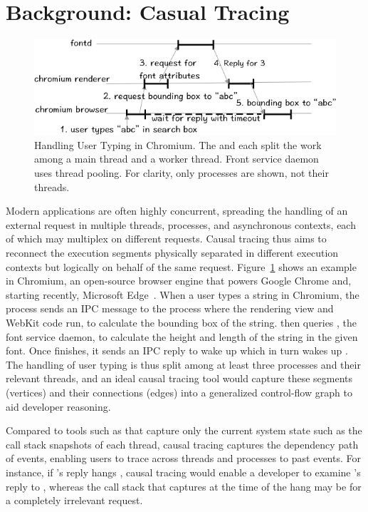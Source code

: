 \section{Background: Casual Tracing} \label{sec:background}

\begin{figure}[tb]
	\footnotesize
    \centering
	 \includegraphics[width=\columnwidth]{./figures/causaltracing_example.png}
    \caption{Handling User Typing in Chromium.  The  and
       each split the work among a main thread and a worker
      thread.  Front service daemon  uses thread pooling.  For
      clarity, only processes are shown, not their threads.}
    \label{fig:chromium-normal}
\end{figure}

Modern applications are often highly concurrent, spreading the handling of
an external request in multiple threads, processes, and asynchronous
contexts, each of which may multiplex on different requests.  Causal
tracing thus aims to reconnect the execution segments physically separated
in different execution contexts but logically on behalf of the same
request.  Figure~\ref{fig:chromium-normal} shows an example in Chromium,
an open-source browser engine that powers Google Chrome and, starting
recently, Microsoft Edge~\cite{chromiumurl}. When a user types a string in
Chromium, the  process sends an IPC message to the 
process where the rendering view and WebKit code run, to calculate the
bounding box of the string.   then queries , the font
service daemon, to calculate the height and length of the string in the
given font.  Once  finishes, it sends an IPC reply to wake up
 which in turn wakes up .  The handling of user
typing is thus split among at least three processes and their relevant
threads, and an ideal causal tracing tool would capture these segments
(vertices) and their connections (edges) into a generalized control-flow
graph to aid developer reasoning.

Compared to tools such as \spindump that capture only the current system
state such as the call stack snapshots of each thread, causal tracing
captures the dependency path of events, enabling users to trace across
threads and processes to past events.  For instance, if 's
reply hangs , causal tracing would enable a developer to
examine 's reply to , whereas the  call
stack that \spindump captures at the time of the hang may be for a
completely irrelevant request.

